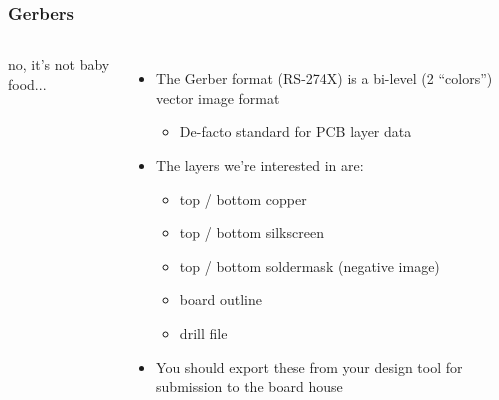 \documentclass{beamer}
\begin{document}
\begin{frame}
\frametitle{Gerbers}
\begin{columns}[t]
{\centering no, it's not baby food... \\}
\begin{itemize}
  \item The Gerber format (RS-274X) is a bi-level (2 ``colors'') vector image format
  \begin{itemize}
    \item De-facto standard for PCB layer data
  \end{itemize}
  \item The layers we're interested in are:
  \begin{itemize}
    \item top / bottom copper
    \item top / bottom silkscreen
    \item top / bottom soldermask (negative image)
    \item board outline
    \item drill file
  \end{itemize}
  \item You should export these from your design tool for submission to the board house
\end{itemize}


\end{columns}
\end{frame}
\end{document}
